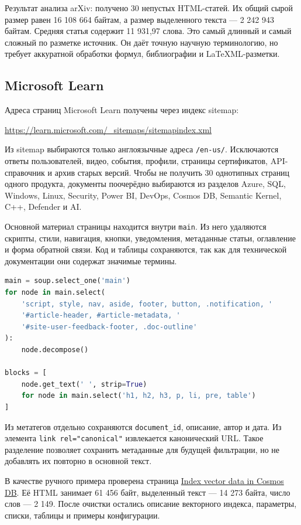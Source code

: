 \documentclass[pdf,unicode,12pt,a4paper,oneside,fleqn]{article}
\begin{document}
Результат анализа arXiv: получено 30 непустых HTML-статей. Их общий сырой размер
равен 16 108 664 байтам, а размер выделенного текста --- 2 242 943 байтам.
Средняя статья содержит 11 931,97 слова. Это самый длинный и самый сложный по
разметке источник. Он даёт точную научную терминологию, но требует аккуратной
обработки формул, библиографии и LaTeXML-разметки.

\subsection{Microsoft Learn}

Адреса страниц Microsoft Learn получены через индекс sitemap:

\begin{center}
\url{https://learn.microsoft.com/_sitemaps/sitemapindex.xml}
\end{center}

Из sitemap выбираются только англоязычные адреса \texttt{/en-us/}. Исключаются
ответы пользователей, видео, события, профили, страницы сертификатов,
API-справочник и архив старых версий. Чтобы не получить 30 однотипных страниц
одного продукта, документы поочерёдно выбираются из разделов Azure, SQL,
Windows, Linux, Security, Power BI, DevOps, Cosmos DB, Semantic Kernel, C++,
Defender и AI.

Основной материал страницы находится внутри \texttt{main}. Из него удаляются
скрипты, стили, навигация, кнопки, уведомления, метаданные статьи, оглавление и
форма обратной связи. Код и таблицы сохраняются, так как для технической
документации они содержат значимые термины.

\begin{lstlisting}[language=Python]
main = soup.select_one('main')
for node in main.select(
    'script, style, nav, aside, footer, button, .notification, '
    '#article-header, #article-metadata, '
    '#site-user-feedback-footer, .doc-outline'
):
    node.decompose()

blocks = [
    node.get_text(' ', strip=True)
    for node in main.select('h1, h2, h3, p, li, pre, table')
]
\end{lstlisting}

Из метатегов отдельно сохраняются \texttt{document\_id}, описание, автор и
дата. Из элемента \texttt{link rel="canonical"} извлекается канонический URL.
Такое разделение позволяет сохранить метаданные для будущей фильтрации, но не
добавлять их повторно в основной текст.

В качестве ручного примера проверена страница
\href{https://learn.microsoft.com/en-us/cosmos-db/index-vector-data}{Index
vector data in Cosmos DB}. Её HTML занимает 61 456 байт, выделенный текст ---
14 273 байта, число слов --- 2 149. После очистки остались описание векторного
индекса, параметры, списки, таблицы и примеры конфигурации.
\end{document}
